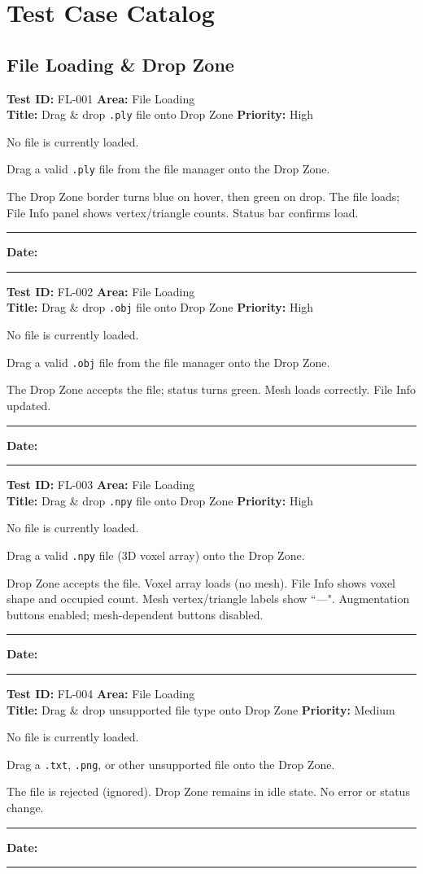 \documentclass[12pt,a4paper]{article}
\newenvironment{testcase}[4]{%
  \smallskip
  \noindent\textbf{Test ID:} #1 \hfill \textbf{Area:} #2 \\
  \textbf{Title:} #3 \hfill \textbf{Priority:} #4
  \begin{description}[leftmargin=2em,style=nextline]
    \item[\textbf{Preconditions:}]
}{%
    \item[\textbf{Steps:}]
    \item[\textbf{Expected Result:}]
    \item[\textbf{Status:}] \rule{3cm}{0.4pt} \hspace{1em} \textbf{Date:} \rule{3cm}{0.4pt}
    \item[\textbf{Notes:}]
  \end{description}
  \smallskip
}
\begin{document}
\section{Test Case Catalog}

\subsection{File Loading \& Drop Zone}

\begin{testcase}{FL-001}{File Loading}{Drag \& drop \texttt{.ply} file onto Drop Zone}{High}
  \item No file is currently loaded.
  \item Drag a valid \texttt{.ply} file from the file manager onto the Drop Zone.
  \item The Drop Zone border turns blue on hover, then green on drop. The file loads; File Info panel shows vertex/triangle counts. Status bar confirms load.
\end{testcase}

\begin{testcase}{FL-002}{File Loading}{Drag \& drop \texttt{.obj} file onto Drop Zone}{High}
  \item No file is currently loaded.
  \item Drag a valid \texttt{.obj} file from the file manager onto the Drop Zone.
  \item The Drop Zone accepts the file; status turns green. Mesh loads correctly. File Info updated.
\end{testcase}

\begin{testcase}{FL-003}{File Loading}{Drag \& drop \texttt{.npy} file onto Drop Zone}{High}
  \item No file is currently loaded.
  \item Drag a valid \texttt{.npy} file (3D voxel array) onto the Drop Zone.
  \item Drop Zone accepts the file. Voxel array loads (no mesh). File Info shows voxel shape and occupied count. Mesh vertex/triangle labels show ``---". Augmentation buttons enabled; mesh-dependent buttons disabled.
\end{testcase}

\begin{testcase}{FL-004}{File Loading}{Drag \& drop unsupported file type onto Drop Zone}{Medium}
  \item No file is currently loaded.
  \item Drag a \texttt{.txt}, \texttt{.png}, or other unsupported file onto the Drop Zone.
  \item The file is rejected (ignored). Drop Zone remains in idle state. No error or status change.
\end{testcase}
\end{document}
